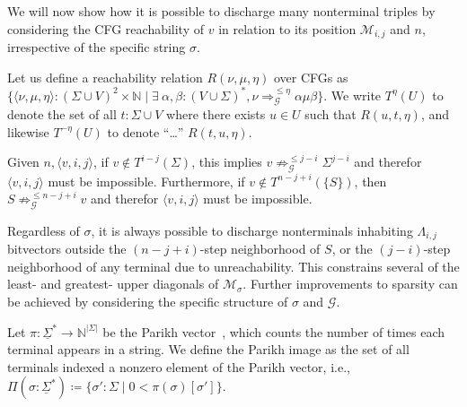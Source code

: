 \documentclass[sigplan,review,anonymous,acmsmall]{acmart}\settopmatter{printfolios=false,printccs=false,printacmref=false}
\begin{document}
We will now show how it is possible to discharge many nonterminal triples by considering the CFG reachability of $v$ in relation to its position $\mathcal{M}_{i, j}$ and $n$, irrespective of the specific string $\sigma$.

\begin{definition}[CFG reachability]
  Let us define a reachability relation $R(\nu, \mu, \eta)$ over CFGs as $\{\langle\nu, \mu, \eta\rangle: (\Sigma \cup V)^2\times\mathbb{N} \mid \exists\:\alpha, \beta: (V\cup\Sigma)^*, \nu \Rightarrow^{\leq \eta}_\mathcal{G} \alpha \mu \beta\}$. We write $T^\eta(U)$ to denote the set of all $t: \Sigma \cup V$ where there exists $u\in U$ such that $R(u, t, \eta)$, and likewise $T^{-\eta}(U)$ to denote ``\ldots'' $R(t, u, \eta)$.
\end{definition}

\begin{lemma}
  Given $n, \langle v, i, j \rangle$, if $v \notin T^{i-j}(\Sigma)$, this implies $v\not\Rightarrow^{\leq j-i}_\mathcal{G} \Sigma^{j-i}$ and therefor $\langle v, i, j \rangle$ must be impossible. Furthermore, if $v \notin T^{n-j+i}(\{S\})$, then $S\not\Rightarrow^{\leq n-j+i}_\mathcal{G} v$ and therefor $\langle v, i, j \rangle$ must be impossible.
\end{lemma}

Regardless of $\sigma$, it is always possible to discharge nonterminals inhabiting $\Lambda_{i, j}$ bitvectors outside the $(n-j+i)$-step neighborhood of $S$, or the $(j-i)$-step neighborhood of any terminal due to unreachability. This constrains several of the least- and greatest- upper diagonals of $\mathcal{M}_\sigma$. Further improvements to sparsity can be achieved by considering the specific structure of $\sigma$ and $\mathcal{G}$.

\begin{definition}
  Let $\pi: \underline\Sigma^*\rightarrow\mathbb{N}^{|\Sigma|}$ be the Parikh vector~\cite{parikh1966context}, which counts the number of times each terminal appears in a string. We define the Parikh image as the set of all terminals indexed a nonzero element of the Parikh vector, i.e., $\Pi(\sigma:\underline\Sigma^*) \coloneq \{\sigma': \Sigma \mid 0 < \pi(\sigma)[\sigma']\}$. %
\end{definition}
\end{document}
